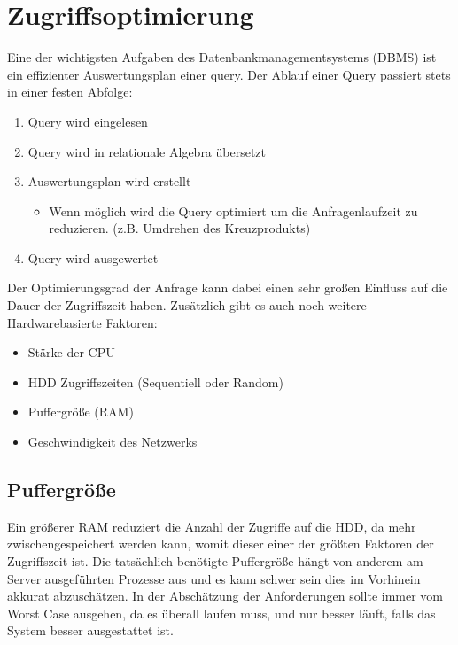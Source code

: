 \documentclass{article}
\begin{document}
	\section{Zugriffsoptimierung}
	Eine der wichtigsten Aufgaben des Datenbankmanagementsystems (DBMS) ist ein effizienter Auswertungsplan einer query. Der Ablauf einer Query passiert stets in einer festen Abfolge:
	\begin{enumerate}
		\item{Query wird eingelesen}
		\item{Query wird in relationale Algebra übersetzt}
		\item{Auswertungsplan wird erstellt}
		\begin{itemize}
			\item{Wenn möglich wird die Query optimiert um die Anfragenlaufzeit zu reduzieren. (z.B. Umdrehen des Kreuzprodukts)}
		\end{itemize}
		\item{Query wird ausgewertet}
	\end{enumerate}
	Der Optimierungsgrad der Anfrage kann dabei einen sehr großen Einfluss auf die Dauer der Zugriffszeit haben. Zusätzlich gibt es auch noch weitere Hardwarebasierte Faktoren:
	\begin{itemize}
		\item{Stärke der CPU}
		\item{HDD Zugriffszeiten (Sequentiell oder Random)}
		\item{Puffergröße (RAM)}
		\item{Geschwindigkeit des Netzwerks}
	\end{itemize}
	\subsection{Puffergröße}
	Ein größerer RAM reduziert die Anzahl der Zugriffe auf die HDD, da mehr zwischengespeichert werden kann, womit dieser einer der größten Faktoren der Zugriffszeit ist. Die tatsächlich benötigte Puffergröße hängt von anderem am Server ausgeführten Prozesse aus und es kann schwer sein dies im Vorhinein akkurat abzuschätzen. In der Abschätzung der Anforderungen sollte immer vom Worst Case ausgehen, da es überall laufen muss, und nur besser läuft, falls das System besser ausgestattet ist.
\end{document}
